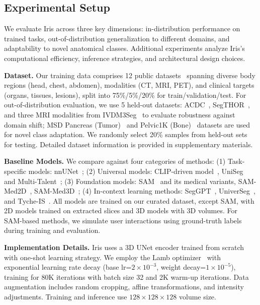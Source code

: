 \subsection{Experimental Setup}
We evaluate Iris across three key dimensions: in-distribution performance on trained tasks, out-of-distribution generalization to different domains, and adaptability to novel anatomical classes. Additional experiments analyze Iris's computational efficiency, inference strategies, and architectural design choices.

\noindent\textbf{Dataset.}
Our training data comprises 12 public datasets~\cite{bcv,bilic2019liver,heller2019kits19,ji2022amos,structseg,CHAOS2021,campello2021multi,rodrigue2012beta,gatidis2022whole,martin2023deep} spanning diverse body regions (head, chest, abdomen), modalities (CT, MRI, PET), and clinical targets (organs, tissues, lesions), split into 75\%/5\%/20\% for train/validation/test. For out-of-distribution evaluation, we use 5 held-out datasets: ACDC~\cite{bernard2018deep}, SegTHOR~\cite{lambert2020segthor}, and three MRI modalities from IVDM3Seg~\cite{ivdm3seg} to evaluate robustness against domain shift; MSD Pancreas (Tumor)~\cite{antonelli2022medical} and Pelvic1K (Bone)~\cite{liu2021deep} datasets are used for novel class adaptation. We randomly select 20\% samples from held-out sets for testing. Detailed dataset information is provided in supplementary materials.

\noindent\textbf{Baseline Models.} 
We compare against four categories of methods:
(1) Task-specific models: nnUNet~\cite{isensee2021nnu};
(2) Universal models: CLIP-driven model~\cite{liu2023clip}, UniSeg~\cite{ye2023uniseg} and Multi-Talent~\cite{ulrich2023multitalent};
(3) Foundation models: SAM~\cite{kirillov2023segment} and its medical variants, SAM-Med2D~\cite{cheng2023sam}, SAM-Med3D~\cite{wang2024sam};
(4) In-context learning methods: SegGPT~\cite{wang2023seggpt}, UniverSeg~\cite{butoi2023universeg}, and Tyche-IS~\cite{rakic2024tyche}.
All models are trained on our curated dataset, except SAM, with 2D models trained on extracted slices and 3D models with 3D volumes. For SAM-based methods, we simulate user interactions using ground-truth labels during training and evaluation.

\noindent\textbf{Implementation Details.}
Iris uses a 3D UNet encoder trained from scratch with one-shot learning strategy. We employ the Lamb optimizer~\cite{you2019large} with exponential learning rate decay (base lr=$2\times10^{-3}$, weight decay=$1\times10^{-5}$), training for 80K iterations with batch size 32 and 2K warm-up iterations. Data augmentation includes random cropping, affine transformations, and intensity adjustments. Training and inference use $128\times128\times128$ volume size.


